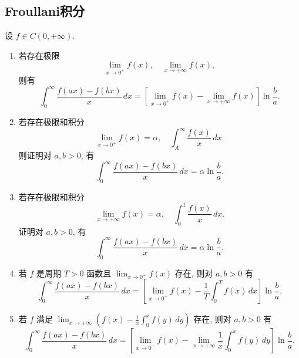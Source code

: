 \documentclass[lang=cn,10pt,thmcnt=section]{elegantbook}
\begin{document}
\subsection{Froullani积分}
\begin{theorem}[Froullani积分]
	设 $f \in C(0, +\infty)$.
\begin{enumerate}
    \item 若存在极限
    \[
        \lim_{x \to 0^+} f(x), \quad \lim_{x \to +\infty} f(x),
    \]
    则有
    \[
        \int_0^\infty \frac{f(ax) - f(bx)}{x} \, dx = \left[ \lim_{x \to 0^+} f(x) - \lim_{x \to +\infty} f(x) \right] \ln\frac{b}{a}.
    \]

    \item 若存在极限和积分
    \[
        \lim_{x \to 0^+} f(x) = \alpha, \quad \int_A^\infty \frac{f(x)}{x} \, dx.
    \]
    则证明对 $a, b > 0$, 有
    \[
        \int_0^\infty \frac{f(ax) - f(bx)}{x} \, dx = \alpha \ln\frac{b}{a}.
    \]

    \item 若存在极限和积分
    \[
        \lim_{x \to +\infty} f(x) = \alpha, \quad \int_0^1 \frac{f(x)}{x} \, dx.
    \]
    证明对 $a, b > 0$, 有
    \[
        \int_0^\infty \frac{f(ax) - f(bx)}{x} \, dx = \alpha \ln\frac{b}{a}.
    \]

    \item 若 $f$ 是周期 $T > 0$ 函数且 $\lim_{x \to 0^+} f(x)$ 存在, 则对 $a, b > 0$ 有
    \[
        \int_0^\infty \frac{f(ax) - f(bx)}{x} \, dx = \left[ \lim_{x \to 0^+} f(x) - \frac{1}{T}\int_0^T f(x) \, dx \right] \ln\frac{b}{a}.
    \]

    \item 若 $f$ 满足 $\lim_{x \to +\infty} \left( f(x) - \frac{1}{x}\int_0^x f(y) \, dy \right)$ 存在, 则对 $a, b > 0$ 有
    \[
        \int_0^\infty \frac{f(ax) - f(bx)}{x} \, dx = \left[ \lim_{x \to 0^+} f(x) - \lim_{x \to +\infty} \frac{1}{x}\int_0^x f(y) \, dy \right] \ln\frac{b}{a}.
    \]
\end{enumerate}
\end{theorem}
\end{document}
